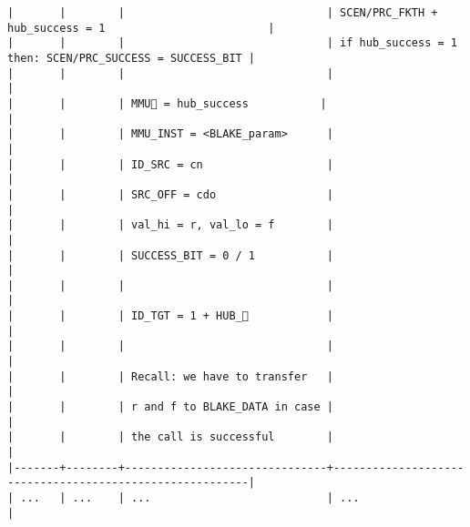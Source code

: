 \documentclass[varwidth=\maxdimen,margin=0.5cm,multi={verbatim}]{standalone}
\begin{document}
\begin{verbatim}
|       |        |                               | SCEN/PRC_FKTH + hub_success = 1                         |
|       |        |                               | if hub_success = 1 then: SCEN/PRC_SUCCESS = SUCCESS_BIT |
|       |        |                               |                                                         |
|       |        | MMU🏴 = hub_success           |                                                         |
|       |        | MMU_INST = <BLAKE_param>      |                                                         |
|       |        | ID_SRC = cn                   |                                                         |
|       |        | SRC_OFF = cdo                 |                                                         |
|       |        | val_hi = r, val_lo = f        |                                                         |
|       |        | SUCCESS_BIT = 0 / 1           |                                                         |
|       |        |                               |                                                         |
|       |        | ID_TGT = 1 + HUB_            |                                                         |
|       |        |                               |                                                         |
|       |        | Recall: we have to transfer   |                                                         |
|       |        | r and f to BLAKE_DATA in case |                                                         |
|       |        | the call is successful        |                                                         |
|-------+--------+-------------------------------+---------------------------------------------------------|
| ...   | ...    | ...                           | ...                                                     |
\end{verbatim}
\end{document}
